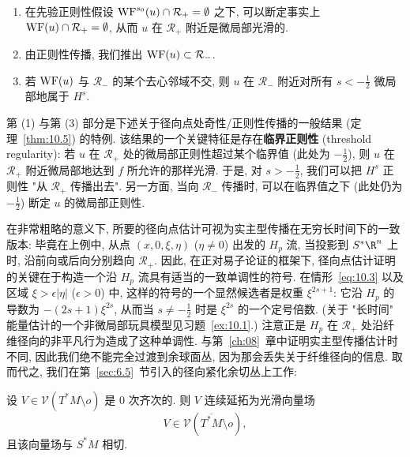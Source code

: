 \begin{enumerate}
    \item 在先验正则性假设 $\operatorname{WF}^{s_0}(u) \cap \mathcal{R}_+ = \emptyset$ 之下, 可以断定事实上 $\operatorname{WF}(u) \cap \mathcal{R}_+ = \emptyset$, 从而 $u$ 在 $\mathcal{R}_+$ 附近是微局部光滑的.
    \item 由正则性传播, 我们推出 $\operatorname{WF}(u) \subset \mathcal{R}_-$.
    \item 若 $\operatorname{WF}(u)$ 与 $\mathcal{R}_-$ 的某个去心邻域不交, 则 $u$ 在 $\mathcal{R}_-$ 附近对所有 $s < -\frac{1}{2}$ 微局部地属于 $H^s$.
\end{enumerate}

第 (1) 与第 (3) 部分是下述关于径向点处奇性/正则性传播的一般结果 (定理~\ref{thm:10.5}) 的特例. 该结果的一个关键特征是存在\textbf{临界正则性} (threshold regularity): 若 $u$ 在 $\mathcal{R}_+$ 处的微局部正则性超过某个临界值 (此处为 $-\frac{1}{2}$), 则 $u$ 在 $\mathcal{R}_+$ 附近微局部地达到 $f$ 所允许的那样光滑. 于是, 对 $s > -\frac{1}{2}$, 我们可以把 $H^s$ 正则性 "从 $\mathcal{R}_+$ 传播出去". 另一方面, 当向 $\mathcal{R}_-$ 传播时, 可以在临界值之下 (此处仍为 $-\frac{1}{2}$) 断定 $u$ 的微局部正则性.

在非常粗略的意义下, 所要的径向点估计可视为实主型传播在无穷长时间下的一致版本: 毕竟在上例中, 从点 $(x, 0, \xi, \eta)$ ($\eta \neq 0$) 出发的 $H_p$ 流, 当投影到 $S^* \R^n$ 上时, 沿前向或后向分别趋向 $\mathcal{R}_+$. 因此, 在正对易子论证的框架下, 径向点估计证明的关键在于构造一个沿 $H_p$ 流具有适当的一致单调性的符号. 在情形~\eqref{eq:10.3} 以及区域 $\xi > \epsilon|\eta|$ ($\epsilon > 0$) 中, 这样的符号的一个显然候选者是权重 $\xi^{2s+1}$: 它沿 $H_p$ 的导数为 $-(2s+1)\xi^{2s}$, 从而当 $s \neq -\frac{1}{2}$ 时是 $\xi^{2s}$ 的一个定号倍数. (关于 "长时间" 能量估计的一个非微局部玩具模型见习题~\ref{ex:10.1}.) 注意正是 $H_p$ 在 $\mathcal{R}_+$ 处沿纤维径向的非平凡行为造成了这种单调性. 与第~\ref{ch:08}~章中证明实主型传播估计时不同, 因此我们绝不能完全过渡到余球面丛, 因为那会丢失关于纤维径向的信息. 取而代之, 我们在第~\ref{sec:6.5}~节引入的径向紧化余切丛上工作:

\begin{lemma}[齐次向量场与紧化]\label{lem:10.2}
设 $V \in \mathcal{V}(T^* M \setminus o)$ 是 0 次齐次的. 则 $V$ 连续延拓为光滑向量场
\begin{equation}\label{eq:10.6}
    V \in \mathcal{V}(\overline{T^* M} \setminus o),
\end{equation}
且该向量场与 $S^* M$ 相切.
\end{lemma}

